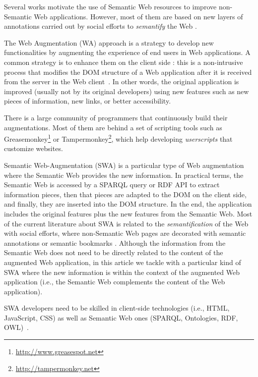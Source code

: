 \documentclass[runningheads]{llncs}
\begin{document}
Several works motivate the use of Semantic Web resources to improve non-Semantic Web applications.  However, most of them are based on new layers of annotations carried out by social efforts to \textit{semantify} the Web \cite{torres2011semdrops,Grassi2013Pundit:Semantics,annoteawww10}.


The Web Augmentation (WA) approach is a strategy to develop new functionalities by augmenting the experience of end users in Web applications.  A common strategy is to enhance them on the client side \cite{Bouvin1999UnifyingAugmentation}: this is a non-intrusive process that modifies the DOM structure of a Web application after it is received from the server in the Web client~\cite{Diaz2012UnderstandingAugmentation}. In other words, the original application is improved (usually not by its original developers) using new features such as new pieces of information, new links, or better accessibility. 

There is a large community of programmers that continuously build their augmentations\cite{Firmenich2014}. Most of them are behind a set of scripting tools such as Greasemonkey\footnote{\url{http://www.greasespot.net}} or Tampermonkey\footnote{\url{http://tampermonkey.net}}, which help developing \textit{userscripts} that customize websites. 

Semantic Web-Augmentation (SWA) is a particular type of Web augmentation where the Semantic Web provides the new information. In practical terms, the Semantic Web is accessed by a SPARQL query or RDF API to extract information pieces, then that pieces are adapted to the DOM on the client side, and finally, they are inserted into the DOM structure. In the end, the application includes the original features plus the new features from the Semantic Web. Most of the current literature about SWA is related to the \textit{semantification} of the Web with social efforts, where non-Semantic Web pages are decorated with semantic annotations or semantic bookmarks \cite{torres2011semdrops,annoteawww10,Grassi2013Pundit:Semantics}. Although the information from the Semantic Web does not need to be directly related to the content of the augmented Web application, in this article we tackle with a particular kind of SWA where the new information is within the context of the augmented Web application (i.e., the Semantic Web complements the content of the Web application).

SWA developers need to be skilled in client-side technologies (i.e., HTML, JavaScript, CSS) as well as Semantic Web ones (SPARQL, Ontologies, RDF, OWL)~\cite{Rico2012AData}.
\end{document}
